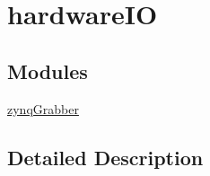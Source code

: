 \hypertarget{group__hardwareIO}{}\section{hardware\+IO}
\label{group__hardwareIO}
\subsection*{Modules}
\begin{DoxyCompactItemize}
\item 
\hyperlink{group__zynqGrabber}{zynq\+Grabber}
\end{DoxyCompactItemize}


\subsection{Detailed Description}
